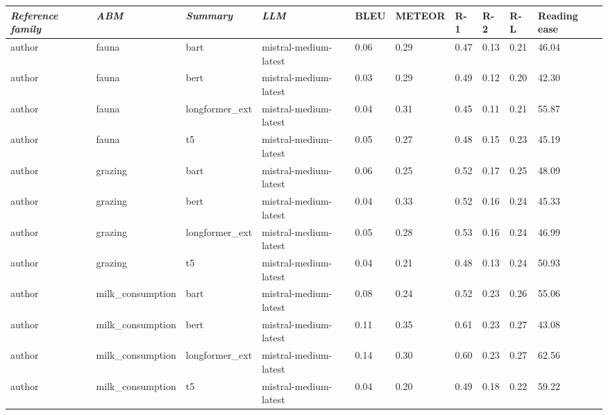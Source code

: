 \begin{tabular}{|l|l|l|l|l|l|l|l|l|l|}
\hline
\textit{\textbf{Reference family}} & \textit{\textbf{ABM}} & \textit{\textbf{Summary}} & \textit{\textbf{LLM}} & BLEU & METEOR & R-1 & R-2 & R-L & Reading ease \\
 \hline
 author & fauna & bart & mistral-medium-latest & 0.06 & 0.29 & 0.47 & 0.13 & 0.21 & 46.04 \\
 \hline
 author & fauna & bert & mistral-medium-latest & 0.03 & 0.29 & 0.49 & 0.12 & 0.20 & 42.30 \\
 \hline
 author & fauna & longformer\_ext & mistral-medium-latest & 0.04 & 0.31 & 0.45 & 0.11 & 0.21 & 55.87 \\
 \hline
 author & fauna & t5 & mistral-medium-latest & 0.05 & 0.27 & 0.48 & 0.15 & 0.23 & 45.19 \\
 \hline
 author & grazing & bart & mistral-medium-latest & 0.06 & 0.25 & 0.52 & 0.17 & 0.25 & 48.09 \\
 \hline
 author & grazing & bert & mistral-medium-latest & 0.04 & 0.33 & 0.52 & 0.16 & 0.24 & 45.33 \\
 \hline
 author & grazing & longformer\_ext & mistral-medium-latest & 0.05 & 0.28 & 0.53 & 0.16 & 0.24 & 46.99 \\
 \hline
 author & grazing & t5 & mistral-medium-latest & 0.04 & 0.21 & 0.48 & 0.13 & 0.24 & 50.93 \\
 \hline
 author & milk\_consumption & bart & mistral-medium-latest & 0.08 & 0.24 & 0.52 & 0.23 & 0.26 & 55.06 \\
 \hline
 author & milk\_consumption & bert & mistral-medium-latest & 0.11 & 0.35 & 0.61 & 0.23 & 0.27 & 43.08 \\
 \hline
 author & milk\_consumption & longformer\_ext & mistral-medium-latest & 0.14 & 0.30 & 0.60 & 0.23 & 0.27 & 62.56 \\
 \hline
 author & milk\_consumption & t5 & mistral-medium-latest & 0.04 & 0.20 & 0.49 & 0.18 & 0.22 & 59.22 \\
\hline
\end{tabular}
